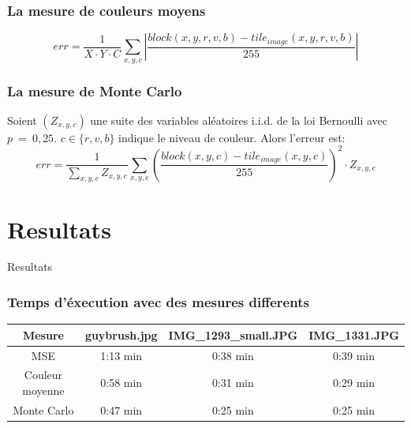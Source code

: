 \documentclass[handout]{beamer}
\begin{document}
\begin{frame}
\frametitle{\bf La mesure de couleurs moyens}
\begin{equation*}
err=\frac{1}{X\cdot Y\cdot C}\sum_{x,y,c}\left|\frac{block(x,y,r,v,b)-tile_{image}(x,y,r,v,b)}{255}\right|
\end{equation*}
\end{frame}
\begin{frame}
\frametitle{\bf La mesure de Monte Carlo}
Soient $(Z_{x,y,c})$ une suite des variables al\'eatoires i.i.d. de la loi Bernoulli avec $p~=~0,25$.
$c\in \{r,v,b\}$ indique le niveau de couleur.
Alors l'erreur est:
\begin{equation*}
err=\frac{1}{\sum_{x,y,c}Z_{x,y,c}}\sum_{x,y,c}\left(\frac{block(x,y,c)-tile_{image}(x,y,c)}{255}\right)^2\cdot Z_{x,y,c}
\end{equation*}
\end{frame}
\section{Resultats}

\begin{frame}
\begin{center}
{\Huge Resultats}
\end{center}
\end{frame}


\begin{frame}
\frametitle{\bf Temps d'\'execution avec des mesures differents}
\begin{table}
\begin{tabular}{|c|c|c|c|}
\hline 
\small Mesure & \small guybrush.jpg & \small IMG\_1293\_small.JPG & \small IMG\_1331.JPG \\ 
\hline 
\small MSE & 1:13 min & 0:38 min & 0:39 min \\ 
\hline 
\small Couleur moyenne & 0:58 min & 0:31 min & 0:29 min \\ 
\hline 
\small Monte Carlo & 0:47 min & 0:25 min & 0:25 min \\ 
\hline 

\end{tabular}
\label{tab:temps}  
\end{table}
\end{frame}
\end{document}
